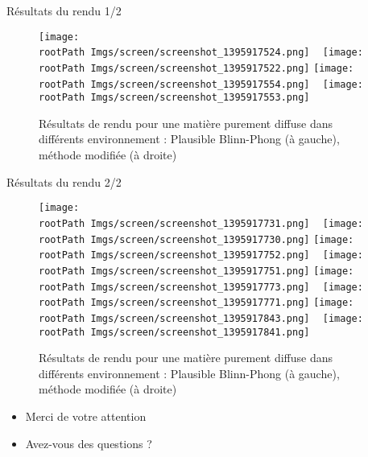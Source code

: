 \documentclass{beamer}
\newcommand*{\rootPath}{}
\begin{document}
\begin{frame}{Résultats du rendu 1/2}
	\begin{figure}
		\centering
		\texttt{[image: \\rootPath Imgs/screen/screenshot\_1395917524.png]}
		~
		\texttt{[image: \\rootPath Imgs/screen/screenshot\_1395917522.png]}
		\hspace{2cm}
		\texttt{[image: \\rootPath Imgs/screen/screenshot\_1395917554.png]}
		~
		\texttt{[image: \\rootPath Imgs/screen/screenshot\_1395917553.png]}
		\caption{Résultats de rendu pour une matière purement diffuse dans différents environnement : Plausible Blinn-Phong (à gauche), méthode modifiée (à droite)  }
	\end{figure}
\end{frame}

\begin{frame}{Résultats du rendu 2/2}
	\begin{figure}
		\centering
		\texttt{[image: \\rootPath Imgs/screen/screenshot\_1395917731.png]}
		~
		\texttt{[image: \\rootPath Imgs/screen/screenshot\_1395917730.png]}
		\hspace{2cm}
		\texttt{[image: \\rootPath Imgs/screen/screenshot\_1395917752.png]}
		~
		\texttt{[image: \\rootPath Imgs/screen/screenshot\_1395917751.png]}
		\vspace{.2cm}
		\texttt{[image: \\rootPath Imgs/screen/screenshot\_1395917773.png]}
		~
		\texttt{[image: \\rootPath Imgs/screen/screenshot\_1395917771.png]}
		\hspace{1.5cm}
		\texttt{[image: \\rootPath Imgs/screen/screenshot\_1395917843.png]}
		~
		\texttt{[image: \\rootPath Imgs/screen/screenshot\_1395917841.png]}
		
		\caption{Résultats de rendu pour une matière purement diffuse dans différents environnement : Plausible Blinn-Phong (à gauche), méthode modifiée (à droite)  }
	\end{figure}
\end{frame}


\begin{frame}
	\begin{itemize}
		\item Merci de votre attention
		\item Avez-vous des questions ?
	\end{itemize}
\end{frame}
\end{document}
